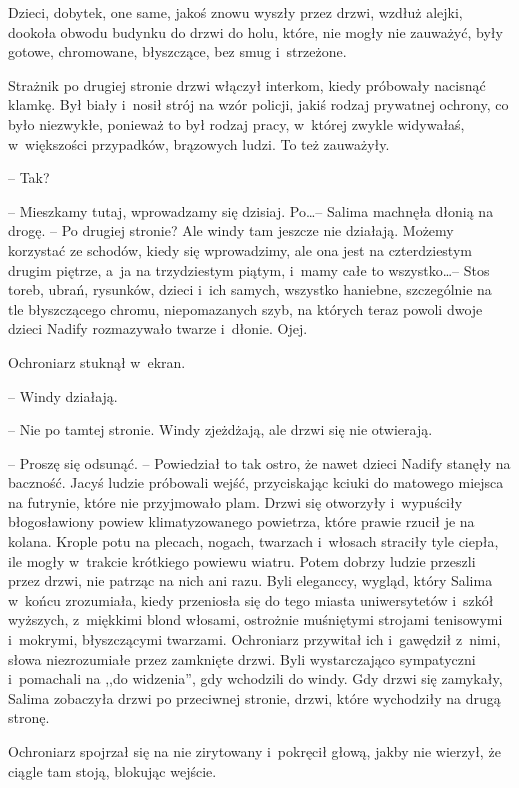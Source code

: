 \documentclass[oneside,polish,11pt,sfheadings]{mwbk}
\begin{document}
Dzieci, dobytek, one same, jakoś znowu wyszły przez drzwi, wzdłuż
alejki, dookoła obwodu budynku do drzwi do holu, które, nie mogły nie
zauważyć, były gotowe, chromowane, błyszczące, bez smug i~strzeżone.

Strażnik po drugiej stronie drzwi włączył interkom, kiedy próbowały
nacisnąć klamkę. Był biały i~nosił strój na wzór policji, jakiś rodzaj
prywatnej ochrony, co było niezwykłe, ponieważ to był rodzaj pracy, w~której zwykle widywałaś, w~większości przypadków, brązowych ludzi. To
też zauważyły.

-- Tak?

-- Mieszkamy tutaj, wprowadzamy się dzisiaj. Po\ldots  -- Salima machnęła
dłonią na drogę. -- Po drugiej stronie? Ale windy tam jeszcze nie
działają. Możemy korzystać ze schodów, kiedy się wprowadzimy, ale ona
jest na czterdziestym drugim piętrze, a~ja na trzydziestym piątym, i~mamy całe to wszystko\ldots  -- Stos toreb, ubrań, rysunków, dzieci i~ich
samych, wszystko haniebne, szczególnie na tle błyszczącego chromu,
niepomazanych szyb, na których teraz powoli dwoje dzieci Nadify
rozmazywało twarze i~dłonie. Ojej.

Ochroniarz stuknął w~ekran. 

-- Windy działają.

-- Nie po tamtej stronie. Windy zjeżdżają, ale drzwi się nie otwierają.

-- Proszę się odsunąć. -- Powiedział to tak ostro, że nawet dzieci Nadify
stanęły na baczność. Jacyś ludzie próbowali wejść, przyciskając kciuki
do matowego miejsca na futrynie, które nie przyjmowało plam. Drzwi się
otworzyły i~wypuściły błogosławiony powiew klimatyzowanego powietrza,
które prawie rzucił je na kolana. Krople potu na plecach, nogach,
twarzach i~włosach straciły tyle ciepła, ile mogły w~trakcie krótkiego
powiewu wiatru. Potem dobrzy ludzie przeszli przez drzwi, nie patrząc na
nich ani razu. Byli eleganccy, wygląd, który Salima w~końcu zrozumiała,
kiedy przeniosła się do tego miasta uniwersytetów i~szkół wyższych, z~miękkimi blond włosami, ostrożnie muśniętymi strojami tenisowymi i~mokrymi, błyszczącymi twarzami. Ochroniarz przywitał ich i~gawędził z~nimi, słowa niezrozumiałe przez zamknięte drzwi. Byli wystarczająco
sympatyczni i~pomachali na ,,do widzenia'', gdy wchodzili do windy. Gdy
drzwi się zamykały, Salima zobaczyła drzwi po przeciwnej stronie, drzwi,
które wychodziły na drugą stronę.

Ochroniarz spojrzał się na nie zirytowany i~pokręcił głową, jakby nie
wierzył, że ciągle tam stoją, blokując wejście. 
\end{document}
